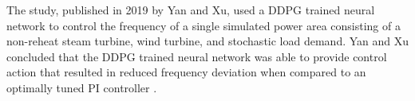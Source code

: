 The study, published in 2019 by Yan and Xu, used a DDPG trained neural network to control the frequency of a single simulated power area consisting of a non-reheat steam turbine, wind turbine, and stochastic load demand. Yan and Xu concluded that the DDPG trained neural network was able to provide control action that resulted in reduced frequency deviation when compared to an optimally tuned PI controller \cite{Yan2019}.

